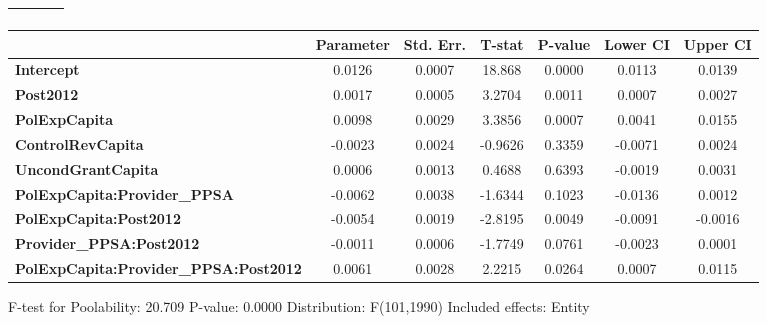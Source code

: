 \begin{center}
\begin{tabular}{lclc}
\textbf{}                                     &                    & \textbf{                     }   &                  \\
\bottomrule
\end{tabular}
\begin{tabular}{lcccccc}
                                              & \textbf{Parameter} & \textbf{Std. Err.} & \textbf{T-stat} & \textbf{P-value} & \textbf{Lower CI} & \textbf{Upper CI}  \\
\midrule
\textbf{Intercept}                            &       0.0126       &       0.0007       &      18.868     &      0.0000      &       0.0113      &       0.0139       \\
\textbf{Post2012}                             &       0.0017       &       0.0005       &      3.2704     &      0.0011      &       0.0007      &       0.0027       \\
\textbf{PolExpCapita}                         &       0.0098       &       0.0029       &      3.3856     &      0.0007      &       0.0041      &       0.0155       \\
\textbf{ControlRevCapita}                     &      -0.0023       &       0.0024       &     -0.9626     &      0.3359      &      -0.0071      &       0.0024       \\
\textbf{UncondGrantCapita}                    &       0.0006       &       0.0013       &      0.4688     &      0.6393      &      -0.0019      &       0.0031       \\
\textbf{PolExpCapita:Provider\_PPSA}          &      -0.0062       &       0.0038       &     -1.6344     &      0.1023      &      -0.0136      &       0.0012       \\
\textbf{PolExpCapita:Post2012}                &      -0.0054       &       0.0019       &     -2.8195     &      0.0049      &      -0.0091      &      -0.0016       \\
\textbf{Provider\_PPSA:Post2012}              &      -0.0011       &       0.0006       &     -1.7749     &      0.0761      &      -0.0023      &       0.0001       \\
\textbf{PolExpCapita:Provider\_PPSA:Post2012} &       0.0061       &       0.0028       &      2.2215     &      0.0264      &       0.0007      &       0.0115       \\
\bottomrule
\end{tabular}
\end{center}

F-test for Poolability: 20.709 \newline
 P-value: 0.0000 \newline
 Distribution: F(101,1990) \newline
  \newline
 Included effects: Entity
